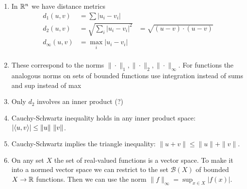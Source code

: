\begin{enumerate}
\item In $\mathbb{R}^n$ we have distance metrics
  \begin{align*}
  d_1(u, v)     &= \sum |u_i - v_i|            &\\
  d_2(u, v)     &= \sqrt{\sum_i |u_i - v_i|^2} &= \sqrt{(u-v)\cdot(u-v)}\\
  d_\infty(u, v) &= \max_i |u_i - v_i|          &\\
  \end{align*}
\item These correspond to the norms $\|\cdot\|_1, \|\cdot\|_2, \|\cdot\|_\infty$. For functions the
  analogous norms on sets of bounded functions use integration instead of sums and sup instead of
  max 
\item Only $d_2$ involves an inner product (?)
\item Cauchy-Schwartz inequality holds in any inner product space: $|\langle u, v \rangle| \leq \|u\| ~ \|v\|$.
\item Cauchy-Schwartz implies the triangle inequality: $\|u + v\| \leq \|u\| + \|v\|$.
\item On any set $X$ the set of real-valued functions is a vector space. To make it into a normed
  vector space we can restrict to the set $\mathcal{B}(X)$ of bounded $X \to \mathbb{R}$ functions. Then we
  can use the norm $\|f\|_\infty = \sup_{x \in X} |f(x)|$.
\end{enumerate}

